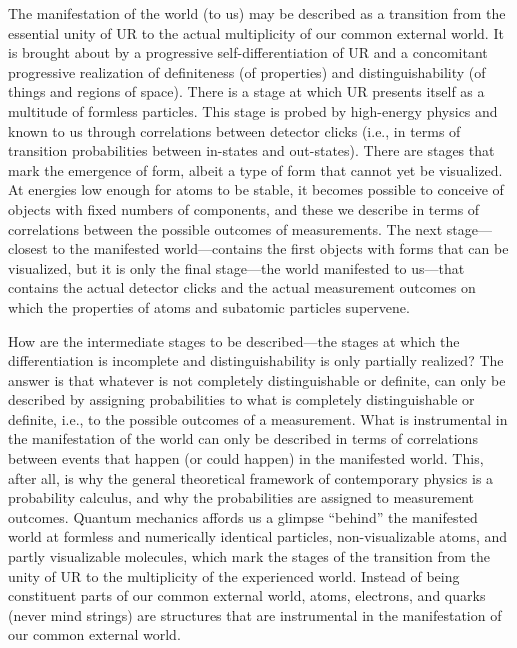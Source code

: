 \documentclass[smallextended]{svjour3}
\begin{document}
The manifestation of the world (to us) may be described as a transition from the essential unity of UR to the actual {multiplicity} of our common external world. It is brought about by a progressive self-differentiation of UR and a concomitant progressive realization of definiteness (of properties) and distinguishability (of things and regions of space). There is a stage at which UR presents itself as a multitude of formless particles. This stage is probed by high-energy physics and known to us through {correlations} between {detector clicks} (i.e., in terms of transition probabilities between in-states and out-states). There are stages that mark the emergence of form, albeit a type of form that cannot yet be visualized. At energies low enough for atoms to be stable, it becomes possible to conceive of objects with fixed numbers of components, and these we describe in terms of {correlations} between the possible outcomes of measurements. The next stage---closest to the manifested world---contains the first objects with forms that can be visualized, but it is only the final stage---the world manifested to us---that contains the actual {detector clicks} and the actual measurement outcomes on which the properties of atoms and subatomic particles supervene.

How are the intermediate stages to be described---the stages at which the differentiation is incomplete and distinguishability is only partially realized? The answer is that whatever is not completely distinguishable or definite, can only be described by assigning probabilities to what is completely distinguishable or definite, i.e., to the possible outcomes of a measurement. What is instrumental in the manifestation of the world can only be described in terms of {correlations} between events that happen (or could happen) in the manifested world. This, after all, is why the general theoretical framework of contemporary physics is a probability calculus, and why the probabilities are assigned to measurement outcomes. Quantum mechanics affords us a glimpse ``behind'' the manifested world at formless and numerically identical particles, non-visualizable atoms, and partly visualizable molecules, which mark the stages of the transition from the unity of UR to the multiplicity of the experienced world. Instead of being constituent parts of our common external world, atoms, electrons, and quarks (never mind strings) are structures that are instrumental in the {manifestation} of our common external world.
\end{document}
